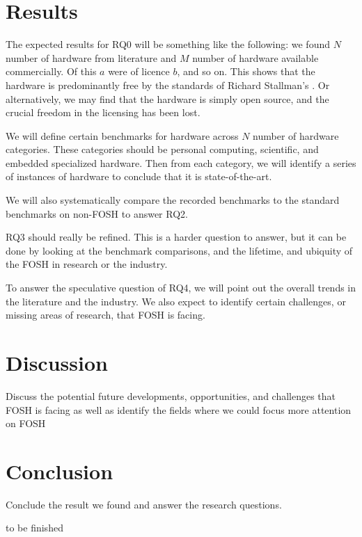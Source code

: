 \documentclass[acmtog]{acmart}
\begin{document}
\section{Results}

The expected results for RQ0 will be something like the following:
we found $N$ number of hardware from literature and $M$ number of hardware available commercially. 
Of this $a$ were of licence $b$, and so on. 
This shows that the hardware is predominantly free by the standards of Richard Stallman's \cite{b0_stallman}.
Or alternatively, we may find that the hardware is simply open source, and the crucial freedom in the licensing has been lost. 

We will define certain benchmarks for hardware across $N$ number of hardware categories. 
These categories should be personal computing, scientific, and embedded specialized hardware. 
Then from each category, we will identify a series of instances of hardware to conclude that it is state-of-the-art.

We will also systematically compare the recorded benchmarks to the standard benchmarks on non-FOSH to answer RQ2. 

RQ3 should really be refined. 
This is a harder question to answer, but it can be done by looking at the benchmark comparisons, and the lifetime, and ubiquity of the FOSH in research or the industry.

To answer the speculative question of RQ4, we will point out the overall trends in the literature and the industry. 
We also expect to identify certain challenges, or missing areas of research, that FOSH is facing.

\section{Discussion}
Discuss the potential future developments, opportunities, and challenges that FOSH is facing as well as identify the fields where we could focus more attention on FOSH  
\section{Conclusion}
Conclude the result we found and answer the research questions.
\nocite{*}
\printbibliography


\begin{acks}
to be finished
\end{acks}
\end{document}
